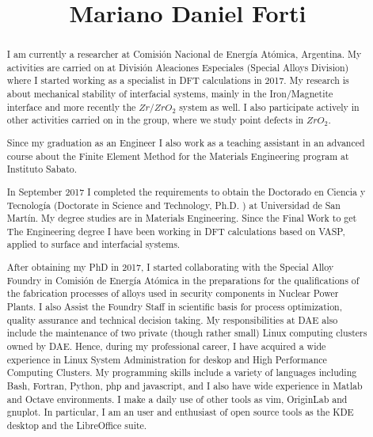 \documentclass{my_cv}
\begin{document}
\title{Mariano Daniel Forti}
\date{}
\begin{titlepage}
\maketitle

\begin{abstract}
  \linespread{1.5}\selectfont
  \thispagestyle{empty}
    I am currently a researcher at Comisión Nacional de Energía Atómica, Argentina. My activities are carried on at División Aleaciones Especiales (Special Alloys Division) where I started working as a specialist in DFT calculations in 2017. My research is about mechanical stability of interfacial systems, mainly in the Iron/Magnetite interface and more recently the $Zr / ZrO_{2}$ system as well. I also participate actively in other activities carried on in the group, where we study point defects in $ZrO_2$.

Since my graduation as an Engineer I also work as a teaching assistant in an advanced course about the Finite Element Method for the Materials Engineering program at Instituto Sabato.

In September 2017 I completed the requirements to obtain the Doctorado en Ciencia y Tecnología (Doctorate in Science and Technology, Ph.D. ) at Universidad de San Martín. My degree studies are in Materials Engineering. Since the Final Work to get The Engineering degree I have been working in DFT calculations based on VASP, applied to surface and interfacial systems.

After obtaining my PhD in 2017, I started collaborating with the Special Alloy Foundry in Comisión de Energía Atómica in the preparations for the qualifications of the fabrication processes of alloys used in security components in Nuclear Power Plants. I also Assist the Foundry Staff in scientific basis for process optimization, quality assurance and technical decision taking. My responsibilities at DAE also include the maintenance of two private (though rather small) Linux computing clusters owned by DAE. Hence, during my professional career, I have acquired a wide experience in Linux System Administration for deskop and High Performance Computing Clusters. My programming skills include a variety of languages including Bash, Fortran, Python, php and javascript, and I also have wide experience in Matlab and Octave environments. I make a daily use of other tools as vim, OriginLab and gnuplot. In particular, I am an user and enthusiast of open source tools as the KDE desktop and the LibreOffice suite. 


\end{abstract}
\vfill
\end{titlepage}
\end{document}
